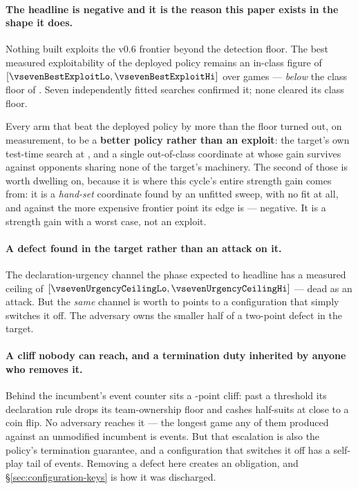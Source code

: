 \paragraph{The headline is negative and it is the reason this paper exists in the shape it does.}
Nothing built exploits the v0.6 frontier beyond the detection floor. The best measured exploitability
of the deployed policy remains an in-class figure of \vsevenBestExploit{}
$[\vsevenBestExploitLo, \vsevenBestExploitHi]$ over \vsevenBestExploitN{} games --- \emph{below} the
class floor of \vsevenPrimaryFloor{}. Seven independently fitted searches confirmed it; none cleared
its class floor.

Every arm that beat the deployed policy by more than the floor turned out, on measurement, to be a
\textbf{better policy rather than an exploit}: the target's own test-time search at
\vsevenSearchAsExploit{}, and a single out-of-class coordinate at \vsevenOneSwitchArm{} whose gain
survives against opponents sharing none of the target's machinery. The second of those is worth
dwelling on, because it is where this cycle's entire strength gain comes from: it is a
\emph{hand-set} coordinate found by an unfitted sweep, with no fit at all, and against the more
expensive frontier point its edge is \vsevenOneSwitchArmVsFmid{} --- negative. It is a strength gain
with a worst case, not an exploit.

\paragraph{A defect found in the target rather than an attack on it.} The declaration-urgency channel
the phase expected to headline has a measured ceiling of \vsevenUrgencyCeiling{}
$[\vsevenUrgencyCeilingLo, \vsevenUrgencyCeilingHi]$ --- dead as an attack. But the \emph{same}
channel is worth \vsevenUrgencyWorthLo{} to \vsevenUrgencyWorthHi{} points to a configuration that
simply switches it off. The adversary owns the smaller half of a two-point defect in the target.

\paragraph{A cliff nobody can reach, and a termination duty inherited by anyone who removes it.}
Behind the incumbent's event counter sits a \vsevenCliff{}-point cliff: past a threshold its
declaration rule drops its team-ownership floor and cashes half-suits at close to a coin flip. No
adversary reaches it --- the longest game any of them produced against an unmodified incumbent is
\vsevenCliffIncumbentTail{} events. But that escalation is also the policy's termination guarantee,
and a configuration that switches it off has a self-play tail of \vsevenCliffTail{} events. Removing
a defect here creates an obligation, and \S\ref{sec:configuration-keys} is how it was discharged.

